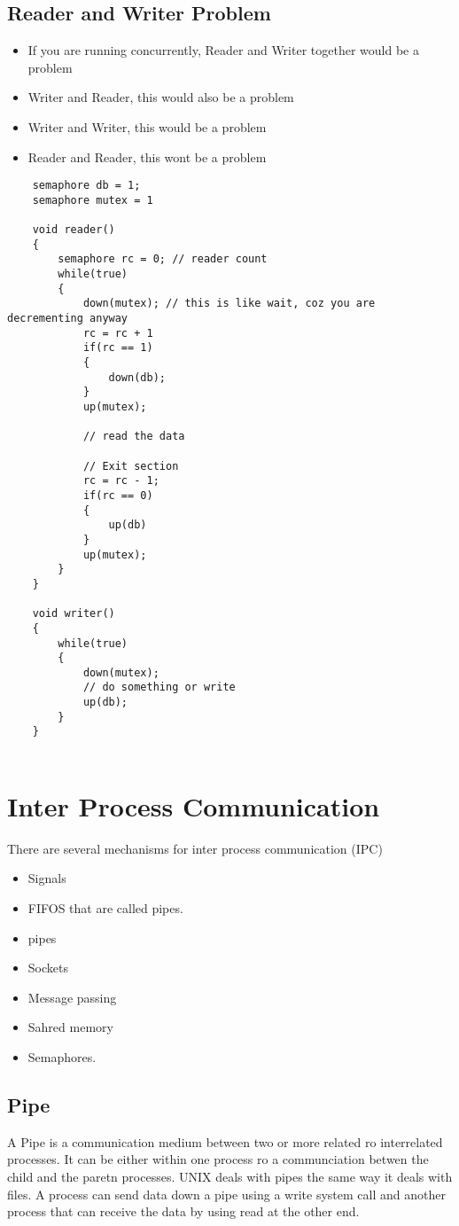 \documentclass[11pt]{article}
\begin{document}
\subsection{Reader and Writer Problem}

\begin{itemize}
	\item If you are running concurrently, Reader and Writer together would be a problem
	\item Writer and Reader, this would also be a problem
	\item Writer and Writer, this would be a problem
	\item Reader and Reader, this wont be a problem
\end{itemize}

\begin{lstlisting}
	semaphore db = 1;
	semaphore mutex = 1

	void reader()
	{
		semaphore rc = 0; // reader count
		while(true)
		{
			down(mutex); // this is like wait, coz you are decrementing anyway
			rc = rc + 1
			if(rc == 1)
			{
				down(db);
			}
			up(mutex);
			
			// read the data 
			
			// Exit section
			rc = rc - 1;
			if(rc == 0)
			{
				up(db)
			}
			up(mutex);
		}
	}

	void writer()
	{
		while(true)
		{
			down(mutex);
			// do something or write
			up(db);
		}
	}


\end{lstlisting}

\section{Inter Process Communication}
There are several mechanisms for inter process communication (IPC)
\begin{itemize}
	\item Signals
	\item FIFOS that are called pipes. 
	\item pipes
	\item Sockets
	\item Message passing
	\item Sahred memory
	\item Semaphores. 
\end{itemize}

\subsection{Pipe}
A Pipe is a communication medium between two or more related ro interrelated processes. It can be either within one process ro a communciation betwen the child and the paretn processes.
UNIX deals with pipes the same way it deals with files. A process can send data down a pipe using a write system call and another process that can receive the data by using read at the other end.  
\end{document}
